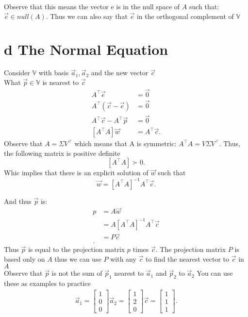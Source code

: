 \documentclass[12pt]{book}
\begin{document}
Observe that this means  the vector e is in the null space of $A$ such that: $\vec e \in null(A)$.
Thus we can also say that $\vec e$ in the orthogonal complement of  $\mathbb{V}$


\section*{d The Normal Equation}
Consider $\mathbb{V}$ with basis  $\vec a_1, \vec a_2$ and the new vector $\vec c$\\
What  $\vec p\in\mathbb{V}$ is nearest to $\vec c$
 \begin{align*}
         A^\top \vec e &= \vec 0\\
         A^\top (\vec c-\vec e) &= \vec 0\\
         A^\top \vec c- A^\top\vec p &= \vec 0\\
         [A^\top A] \vec w &= A^\top\vec c
.\end{align*}
Observe that $A=\Sigma V^\top$ which means that A is symmetric:  $A^\top A = V\Sigma V^\top$. Thus, the following matrix is
        positive definite  
        \[
        [A^\top A] \succ 0
        .\] 
Whic implies that there is an explicit solution of $\vec w$ such that
\[
\vec w ={[A^\top A]}^{-1}A^\top\vec c
.\] 

And thus $\vec p$ is:
 \begin{align*}
        p &= A\vec w \\
        &= A{[A^\top A]}^{-1} A^\top \vec c \\
        &= P\vec c \\
.\end{align*}
Thus $\vec p$ is equal to the projection matrix  $p$ times  $\vec c$.
The projection matrix $P$ is based only on  $A$ thus we can use  $P$ with any  $\vec c$ to find the nearest vector to $\vec c$ in $A$\\
Observe that $\vec p$ is not the sum of  $\vec p_1$ nearest to $\vec a_1$ and $\vec p_2$ to $\vec a_2$
You can use these as examples to practice
\begin{align*}
        \vec a_1 = \begin{bmatrix} 1\\0\\0 \end{bmatrix}
        \vec a_2 = \begin{bmatrix} 1\\2\\0 \end{bmatrix}
        \vec c = \begin{bmatrix} 1\\1\\1 \end{bmatrix} 
.\end{align*}
\pagebreak
\end{document}
